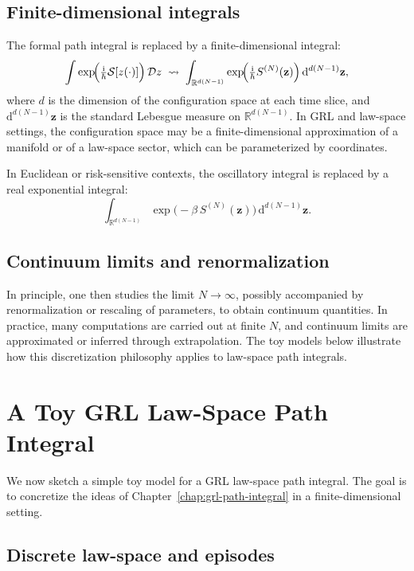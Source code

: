 \documentclass[11pt]{book}
\theoremstyle{plain}
\theoremstyle{definition}
\theoremstyle{remark}
\begin{document}
\subsection*{Finite-dimensional integrals}

The formal path integral is replaced by a finite-dimensional
integral:
\[
   \int \exp\!\Bigl(\tfrac{\mathrm{i}}{\hbar}
   \mathcal{S}[z(\cdot)]\Bigr)\,\mathcal{D}z
   \;\leadsto\;
   \int_{\mathbb{R}^{d(N-1)}} \exp\!\Bigl(\tfrac{\mathrm{i}}{\hbar}
   S^{(N)}(\mathbf{z})\Bigr)\,\mathrm{d}^{d(N-1)}\mathbf{z},
\]
where $d$ is the dimension of the configuration space at each time
slice, and $\mathrm{d}^{d(N-1)}\mathbf{z}$ is the standard Lebesgue
measure on $\mathbb{R}^{d(N-1)}$. In GRL and law-space settings, the
configuration space may be a finite-dimensional approximation of
a manifold or of a law-space sector, which can be parameterized by
coordinates.

In Euclidean or risk-sensitive contexts, the oscillatory integral
is replaced by a real exponential integral:
\[
   \int_{\mathbb{R}^{d(N-1)}} \exp\!\bigl(-\beta\,
   S^{(N)}(\mathbf{z})\bigr)\,\mathrm{d}^{d(N-1)}\mathbf{z}.
\]

\subsection*{Continuum limits and renormalization}

In principle, one then studies the limit $N\to\infty$, possibly
accompanied by renormalization or rescaling of parameters, to obtain
continuum quantities. In practice, many computations are carried out
at finite $N$, and continuum limits are approximated or inferred
through extrapolation. The toy models below illustrate how this
discretization philosophy applies to law-space path integrals.

\section{A Toy GRL Law-Space Path Integral}
\label{sec:toy-grl-lawspace-pi}


We now sketch a simple toy model for a GRL law-space path integral.
The goal is to concretize the ideas of
Chapter~\ref{chap:grl-path-integral} in a finite-dimensional
setting.

\subsection*{Discrete law-space and episodes}
\end{document}
